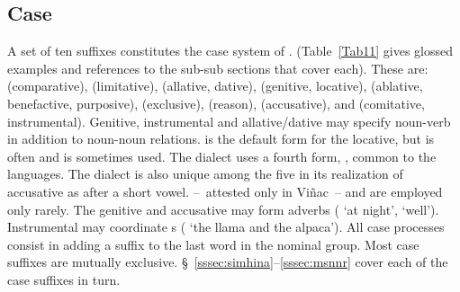 \subsection{Case}\label{ssec:case}
A set of ten suffixes constitutes the case system of \SYQ. (Table~\ref{Tab11} gives glossed examples and references to the sub-sub sections that cover each). These are:  (comparative),  (limitative),  (allative, dative),  (genitive, locative),  (ablative, benefactive, purposive),  (exclusive),  (reason),  (accusative), and  (comitative, instrumental). Genitive, instrumental and allative/dative may specify noun-verb in addition to noun-noun relations.  is the default form for the locative, but  is often and  is sometimes used. The \CH{} dialect uses a fourth form, , common to the \QI{} languages. The \CH{} dialect is also unique among the five in its realization of accusative  as  after a short vowel.  --~attested only in Viñac~-- and  are employed only rarely. The genitive and accusative may form adverbs ( ‘at night’,  ‘well’). Instrumental  may coordinate s (  ‘the llama and the alpaca’). All case processes consist in adding a suffix to the last word in the nominal group. Most case suffixes are mutually exclusive. §~\ref{sssec:simhina}--\ref{sssec:msnnr} cover each of the case suffixes in turn.

